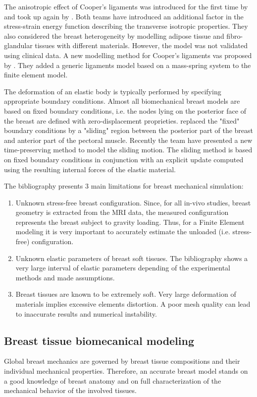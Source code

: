  The anisotropic effect of Cooper's ligaments was introduced for the first time by \cite{pathmanathan_predicting_2008} and took up again by \cite{han_development_2012}. Both teams have introduced an additional factor in the stress-strain energy function describing the transverse isotropic properties. They also	 considered the breast heterogeneity by modelling adipose tissue and fibro-glandular tissues with different materials. However, the model was not validated using clinical data. A new modelling method for Cooper's ligaments vas proposed by \cite{georgii_simulation_2016}. They added a generic ligaments model based on a mass-spring system to the finite element model. 
 
 The deformation of an elastic body is typically performed by specifying appropriate boundary conditions. Almost all biomechanical breast models are based on fixed boundary conditions, i.e. the nodes lying on the posterior face of the breast are defined with zero-displacement proprieties.
\cite{payan_application_2012} replaced the "fixed" boundary conditions by a "sliding" region between the posterior part of the breast and anterior part of the pectoral muscle. Recently the \cite{patz_sliding_2015} team have presented a new time-preserving method to model the sliding motion. The sliding method is based on fixed boundary conditions in conjunction with an explicit update computed using the resulting internal forces of the elastic material.

The bibliography presents 3 main limitations for breast mechanical simulation:
\begin{enumerate}
\item Unknown stress-free breast configuration. Since, for all in-vivo studies, breast geometry is extracted from the MRI data, the measured configuration represents the breast subject to gravity loading. Thus, for a Finite Element modeling it is very important to accurately estimate the unloaded (i.e. stress-free) configuration.
\item Unknown elastic parameters of breast soft tissues. The bibliography shows a very large interval of elastic parameters depending of the experimental methods and made assumptions.
 \item Breast tissues are known to be extremely soft. Very large deformation of materials implies excessive elements distortion. A poor mesh quality can lead to inaccurate results and numerical instability.
\end{enumerate} 

\subsection{Breast tissue biomecanical modeling}
Global breast mechanics are governed by breast tissue compositions and their individual mechanical properties. Therefore, an accurate breast model stands on a good knowledge of breast anatomy and on full characterization of the mechanical behavior of the involved tissues.

